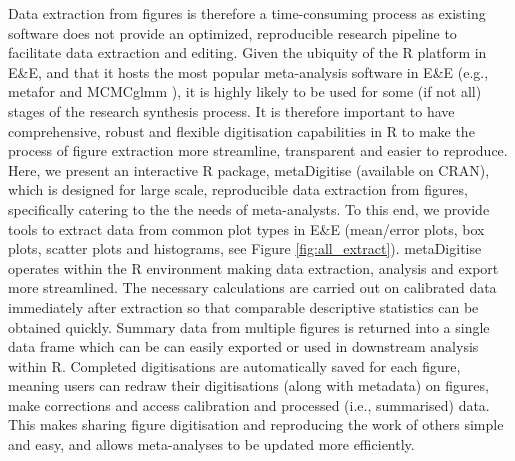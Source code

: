 \documentclass[12pt]{article}
\newcommand{\pkg}[1]{{\fontseries{b}\selectfont #1}}
\let\proglang=\textsf
\begin{document}
Data extraction from figures is therefore a time-consuming process as existing software does not provide an optimized, reproducible research pipeline to facilitate data extraction and editing. Given the ubiquity of the R platform in E\&E, and that it hosts the most popular meta-analysis software in E\&E (e.g., metafor \citep{Viechtbauer2010} and MCMCglmm \citep{Hadfield2010b}), it is highly likely to be used for some (if not all) stages of the research synthesis process. It is therefore important to have comprehensive, robust and flexible digitisation capabilities in R to make the process of figure extraction more streamline,  transparent and easier to reproduce. Here, we present an interactive \proglang{R} package, \pkg{metaDigitise} (available on CRAN), which is designed for large scale, reproducible data extraction from figures, specifically catering to the the needs of meta-analysts. To this end, we provide tools to extract data from common plot types in E\&E (mean/error plots, box plots, scatter plots and histograms, see Figure \ref{fig:all_extract}). \pkg{metaDigitise} operates within the \proglang{R} environment making data extraction, analysis and export more streamlined. The necessary calculations are carried out on calibrated data immediately after extraction so that comparable descriptive statistics can be obtained quickly. Summary data from multiple figures is returned into a single data frame which can be can easily exported or used in downstream analysis within \proglang{R}. Completed digitisations are automatically saved for each figure, meaning users can redraw their digitisations (along with metadata) on figures, make corrections and access calibration and processed (i.e., summarised) data. This makes sharing figure digitisation and reproducing the work of others simple and easy, and allows meta-analyses to be updated more efficiently.



\end{document}
